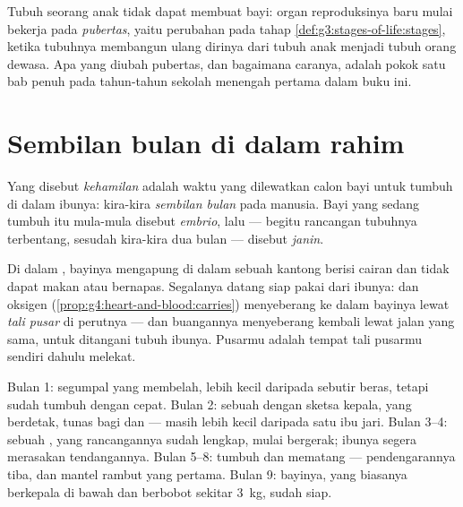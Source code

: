 \begin{remark}\label{rem:g5:human-reproduction:adults}
Tubuh seorang anak tidak dapat membuat bayi: organ reproduksinya baru
mulai bekerja pada \emph{pubertas}, yaitu perubahan pada tahap 
\cref{def:g3:stages-of-life:stages}, ketika tubuhnya membangun ulang
dirinya dari tubuh anak menjadi tubuh orang dewasa. Apa yang diubah
pubertas, dan bagaimana caranya, adalah pokok satu bab penuh pada
tahun-tahun sekolah menengah pertama dalam buku ini.
\end{remark}

\section{Sembilan bulan di dalam rahim}

\begin{definition}[Kehamilan]\label{def:g5:human-reproduction:pregnancy}
Yang disebut \emph{kehamilan} adalah waktu yang
dilewatkan calon bayi untuk tumbuh di dalam  ibunya: kira-kira
\emph{sembilan bulan} pada manusia. Bayi yang sedang tumbuh itu
mula-mula disebut \emph{embrio}, lalu --- begitu
rancangan tubuhnya terbentang, sesudah kira-kira dua bulan --- disebut
\emph{janin}.
\end{definition}

\begin{proposition}\label{prop:g5:human-reproduction:cord}
Di dalam , bayinya mengapung di dalam sebuah kantong berisi
cairan dan tidak dapat makan atau bernapas. Segalanya datang siap
pakai dari  ibunya:  dan oksigen
(\cref{prop:g4:heart-and-blood:carries}) menyeberang ke dalam 
bayinya lewat \emph{tali pusar} di perutnya --- dan
buangannya menyeberang kembali lewat jalan yang sama, untuk ditangani
tubuh ibunya. Pusarmu adalah tempat tali pusarmu sendiri dahulu
melekat.
\end{proposition}
\admitted

\begin{example}\label{ex:g5:human-reproduction:timetable}
Bulan 1: segumpal  yang membelah, lebih kecil daripada sebutir
beras, tetapi sudah tumbuh dengan cepat. Bulan 2: sebuah  dengan
sketsa kepala,  yang berdetak, tunas bagi  dan 
--- masih lebih kecil daripada satu ibu jari. Bulan 3--4: sebuah
, yang rancangannya sudah lengkap, mulai bergerak; ibunya segera
merasakan tendangannya. Bulan 5--8: tumbuh dan mematang ---
pendengarannya tiba, dan mantel rambut yang pertama. Bulan 9: bayinya,
yang biasanya berkepala di bawah dan berbobot sekitar \qty{3}{kg},
sudah siap.
\end{example}


